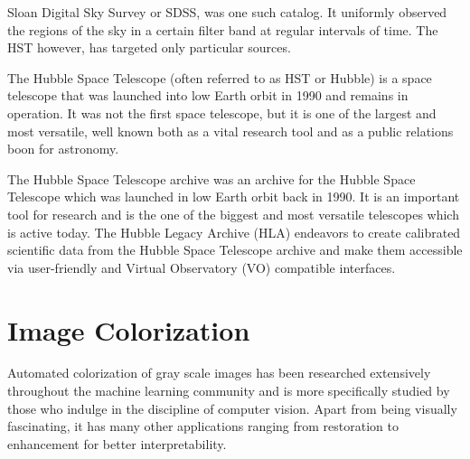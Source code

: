 \documentclass[12pt, letterpaper]{article}
\begin{document}
Sloan Digital Sky Survey or SDSS, was one such catalog. It uniformly observed the regions of the sky in a certain filter band at regular intervals of time. The HST however, has targeted only particular sources.

The Hubble Space Telescope (often referred to as HST or Hubble) is a space telescope that was launched into low Earth orbit in 1990 and remains in operation. It was not the first space telescope, but it is one of the largest and most versatile, well known both as a vital research tool and as a public relations boon for astronomy.

The Hubble Space Telescope archive was an archive for the Hubble Space Telescope which was launched in low Earth orbit back in 1990. It is an important tool for research and is the one of the biggest and most versatile telescopes which is active today.
The Hubble Legacy Archive (HLA) endeavors to create calibrated scientific data from the Hubble Space Telescope archive and make them accessible via user-friendly and Virtual Observatory (VO) compatible interfaces. 

	\section{Image Colorization}
		\hspace*{0.25 in} Automated colorization of gray scale images has been researched extensively throughout the machine learning community and is more specifically studied by those who indulge in the discipline of computer vision. Apart from being visually fascinating, it has many other applications ranging from restoration to enhancement for better interpretability.  
		
\renewcommand\bibname{References}


\end{document}
